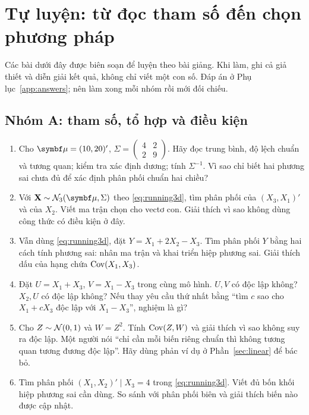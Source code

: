 \clearpage
\section{Tự luyện: từ đọc tham số đến chọn phương pháp}
\label{sec:practice}
Các bài dưới đây được biên soạn để luyện theo bài giảng. Khi làm, ghi cả
giả thiết và diễn giải kết quả, không chỉ viết một con số. Đáp án ở
Phụ lục~\ref{app:answers}; nên làm xong mỗi nhóm rồi mới đối chiếu.

\subsection{Nhóm A: tham số, tổ hợp và điều kiện}
\begin{enumerate}[label=\textbf{Bài \arabic*.},ref=\arabic*,series=practice]
\item Cho $\vmu=(10,20)'$,
$\Sigma=\begin{pmatrix}4&2\\2&9\end{pmatrix}$.
Hãy đọc trung bình, độ lệch chuẩn và tương quan; kiểm tra xác định dương;
tính $\Sigma^{-1}$. Vì sao chỉ biết hai phương sai chưa đủ để xác định
phân phối chuẩn hai chiều?

\item Với $\mathbf X\sim\N_3(\vmu,\Sigma)$ theo
\eqref{eq:running3d}, tìm phân phối của $(X_3,X_1)'$ và của $X_2$.
Viết ma trận chọn cho vectơ con. Giải thích vì sao không dùng công thức
có điều kiện ở đây.

\item Vẫn dùng \eqref{eq:running3d}, đặt $Y=X_1+2X_2-X_3$.
Tìm phân phối $Y$ bằng hai cách tính phương sai: nhân ma trận và khai triển
hiệp phương sai. Giải thích dấu của hạng chứa $\operatorname{Cov}(X_1,X_3)$.

\item Đặt $U=X_1+X_3$, $V=X_1-X_3$ trong cùng mô hình.
$U,V$ có độc lập không? $X_2,U$ có độc lập không? Nếu thay yêu cầu thứ
nhất bằng ``tìm $c$ sao cho $X_1+cX_3$ độc lập với $X_1-X_3$'', nghiệm là gì?

\item Cho $Z\sim\mathcal N(0,1)$ và $W=Z^2$.
Tính $\operatorname{Cov}(Z,W)$ và giải thích vì sao không suy ra độc lập.
Một người nói ``chỉ cần mỗi biến riêng chuẩn thì không tương quan tương
đương độc lập''. Hãy dùng phản ví dụ ở Phần~\ref{sec:linear} để bác bỏ.

\item Tìm phân phối $(X_1,X_2)'\mid X_3=4$ trong
\eqref{eq:running3d}. Viết đủ bốn khối hiệp phương sai cần dùng.
So sánh với phân phối biên và giải thích biến nào được cập nhật.
\end{enumerate}

